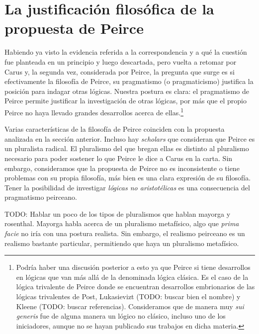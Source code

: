 \documentclass[
  structure  = article,
  pagelayout = periodicalaureo,%
  secfont    = italic,
  subsecfont = italic,
  version    = final,%
]{suftesi}
\begin{document}

\section{La justificación filosófica de la propuesta de Peirce} %
\label{sec:La justificación filosófica de la propuesta de Peirce}

Habiendo ya visto la evidencia referida a la correspondencia y a qué la cuestión fue planteada en un principio y luego descartada, pero vuelta a retomar por Carus y, la segunda vez, considerada por Peirce, la pregunta que surge es si efectivamente la filosofía de Peirce, su pragmatismo (o pragmaticismo) justifica la posición para indagar otras lógicas. Nuestra postura es clara: el pragmatismo de Peirce permite justificar la investigación de otras lógicas, por más que el propio Peirce no haya llevado grandes desarrollos acerca de ellas.\footnote{Podría haber una discusión posterior a esto ya que Peirce si tiene desarrollos en lógicas que van más allá de la denominada lógica clásica. Es el caso de la lógica trivalente de Peirce \cite{fisch1966, turquette1967, turquette1969, lane1999, odland2021} donde se encuentran desarrollos embrionarios de las lógicas trivalentes de Post, Lukasievizt (TODO: buscar bien el nombre) y Kleene (TODO: buscar referencias). Consideramos que de manera muy \emph{sui generis} fue de alguna manera un lógico no clásico, incluso uno de los iniciadores, aunque no se hayan publicado sus trabajos en dicha materia.}

Varias características de la filosofía de Peirce coinciden con la propuesta analizada en la sección anterior. Incluso hay \emph{scholars} que consideran que Peirce es un pluralista radical\cite{mayorga2016, rosenthal1994}. El pluralismo del que bregan ellas es distinto al pluralismo necesario para poder sostener lo que Peirce le dice a Carus en la carta. Sin embargo, consideramos que la propuesta de Peirce no es inconsistente o tiene problemas con su propia filosofía, más bien es una clara expresión de su filosofía. Tener la posibilidad de investigar \emph{lógicas no aristotélicas} es una consecuencia del pragmatismo peirceano.

TODO: Hablar un poco de los tipos de pluralismos que hablan mayorga y rosenthal.
Mayorga habla acerca de un pluralismo metafísico, algo que \emph{prima facie} no iría con una postura realista. Sin embargo, el realismo peirceano es un realismo bastante particular, permitiendo que haya un pluralismo metafísico.
\end{document}
